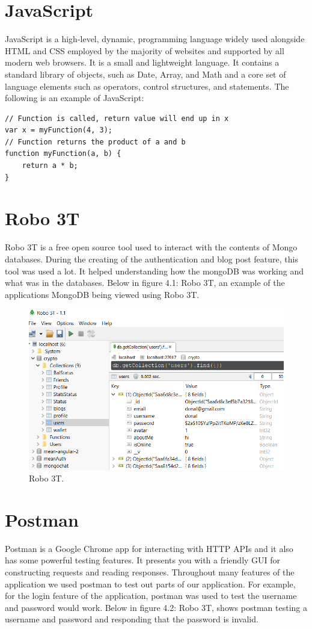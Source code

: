 \section{JavaScript}
JavaScript is a high-level, dynamic, programming language widely used alongside HTML and CSS employed by the majority of websites and supported by all modern web browsers. It is a small and lightweight language. It contains a standard library of objects, such as Date, Array, and Math and a core set of language elements such as operators, control structures, and statements\cite{Introduc25}.
The following is an example of JavaScript\cite{JavaScri59}:
\begin{lstlisting}
// Function is called, return value will end up in x
var x = myFunction(4, 3);   
// Function returns the product of a and b
function myFunction(a, b) {
    return a * b;   
}
\end{lstlisting}

\section{Robo 3T}
Robo 3T is a free open source tool used to interact with the contents of Mongo databases\cite{Robo3Tfo20}. During the creating of the authentication and blog post feature, this tool was used a lot. It helped understanding how the mongoDB was working and what was in the databases. Below in figure 4.1: Robo 3T, an example of the applications MongoDB being viewed using Robo 3T.

\begin{figure}[H]
\centering
\includegraphics[]{img/Robo3T.png}
\caption{Robo 3T.}
\end{figure}

\section{Postman}
Postman is a Google Chrome app for interacting with HTTP APIs and it also has some powerful testing features. It presents you with a friendly GUI for constructing requests and reading responses\cite{APITesti56}. Throughout many features of the application we used postman to test out parts of our application. For example, for the login feature of the application, postman was used to test the username and password would work. Below in figure 4.2: Robo 3T, shows postman testing a username and password and responding that the password is invalid.

